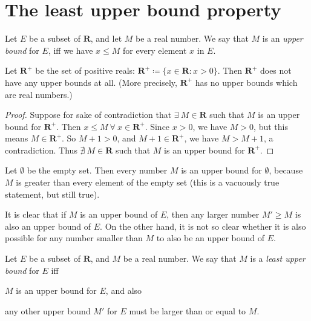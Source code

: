 \section{The least upper bound property}\label{sec 5.5}

\begin{definition}\label{5.5.1}
Let \(E\) be a subset of \(\mathbf{R}\), and let \(M\) be a real number.
We say that \(M\) is an \emph{upper bound} for \(E\), iff we have \(x \leq M\) for every element \(x\) in \(E\).
\end{definition}

\begin{additional corollary}\label{ac 5.5.1}
Let \(\mathbf{R}^+\) be the set of positive reals: \(\mathbf{R}^+ \coloneqq \{x \in \mathbf{R} : x > 0\}\).
Then \(\mathbf{R}^+\) does not have any upper bounds at all.
(More precisely, \(\mathbf{R}^+\) has no upper bounds which are real numbers.)
\end{additional corollary}

\begin{proof}
Suppose for sake of contradiction that \(\exists\ M \in \mathbf{R}\) such that \(M\) is an upper bound for \(\mathbf{R}^+\).
Then \(x \leq M \ \forall\ x \in \mathbf{R}^+\).
Since \(x > 0\), we have \(M > 0\), but this means \(M \in \mathbf{R}^+\).
So \(M + 1 > 0\), and \(M + 1 \in \mathbf{R}^+\), we have \(M > M + 1\), a contradiction.
Thus \(\nexists\ M \in \mathbf{R}\) such that \(M\) is an upper bound for \(\mathbf{R}^+\).
\end{proof}

\setcounter{theorem}{3}
\begin{example}\label{5.5.4}
Let \(\emptyset\) be the empty set.
Then every number \(M\) is an upper bound for \(\emptyset\), because \(M\) is greater than every element of the empty set
(this is a vacuously true statement, but still true).
\end{example}

\begin{note}
It is clear that if \(M\) is an upper bound of \(E\), then any larger number \(M' \geq M\) is also an upper bound of \(E\).
On the other hand, it is not so clear whether it is also possible for any number smaller than \(M\) to also be an upper bound of \(E\).
\end{note}

\begin{definition}\label{5.5.5}
Let \(E\) be a subset of \(\mathbf{R}\), and \(M\) be a real number.
We say that \(M\) is a \emph{least upper bound} for \(E\) iff
\begin{enumerate*}
    \item \(M\) is an upper bound for \(E\), and also
    \item any other upper bound \(M'\) for \(E\) must be larger than or equal to \(M\).
\end{enumerate*}
\end{definition}

